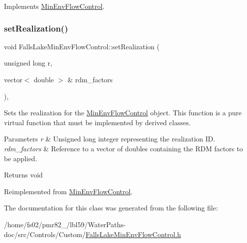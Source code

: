 Implements \mbox{\hyperlink{classMinEnvFlowControl_a5de79615852eb0c937dd559a9eb9402d}{Min\+Env\+Flow\+Control}}.

\mbox{\label{classFallsLakeMinEnvFlowControl_a6ea8a5e9ff9179066cceb77d896f3f97}} 
\subsubsection{\texorpdfstring{set\+Realization()}{setRealization()}}
{\footnotesize\ttfamily void Falls\+Lake\+Min\+Env\+Flow\+Control\+::set\+Realization (\begin{DoxyParamCaption}\item[{unsigned long}]{r,  }\item[{vector$<$ double $>$ \&}]{rdm\+\_\+factors }\end{DoxyParamCaption})\hspace{0.3cm}{\ttfamily [override]}, {\ttfamily [virtual]}}



Sets the realization for the {\ttfamily \mbox{\hyperlink{classMinEnvFlowControl}{Min\+Env\+Flow\+Control}}} object. This function is a pure virtual function that must be implemented by derived classes. 


\begin{DoxyParams}{Parameters}
{\em r} & Unsigned long integer representing the realization ID. \\
\hline
{\em rdm\+\_\+factors} & Reference to a vector of doubles containing the R\+DM factors to be applied.\\
\hline
\end{DoxyParams}
\begin{DoxyReturn}{Returns}
void 
\end{DoxyReturn}


Reimplemented from \mbox{\hyperlink{classMinEnvFlowControl_a630550c31f5c4e1a368289cbd5ab98ee}{Min\+Env\+Flow\+Control}}.



The documentation for this class was generated from the following file\+:\begin{DoxyCompactItemize}
\item 
/home/fs02/pmr82\+\_/lbl59/\+Water\+Paths-\/doc/src/\+Controls/\+Custom/\mbox{\hyperlink{FallsLakeMinEnvFlowControl_8h}{Falls\+Lake\+Min\+Env\+Flow\+Control.\+h}}\end{DoxyCompactItemize}
